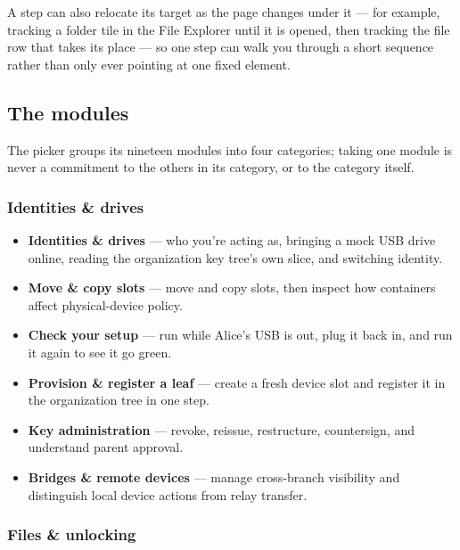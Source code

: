 A step can also relocate its target as the page changes under it --- for
example, tracking a folder tile in the File Explorer until it is opened,
then tracking the file row that takes its place --- so one step can walk
you through a short sequence rather than only ever pointing at one fixed
element.

\subsection{The modules}

The picker groups its nineteen modules into four categories; taking one
module is never a commitment to the others in its category, or to the
category itself.

\subsubsection{Identities \& drives}

\begin{itemize}
  \item \textbf{Identities \& drives} --- who you're acting as, bringing a
  mock USB drive online, reading the organization key tree's own slice, and
  switching identity.
  \item \textbf{Move \& copy slots} --- move and copy slots, then inspect
  how containers affect physical-device policy.
  \item \textbf{Check your setup} --- run  while
  Alice's USB is out, plug it back in, and run it again to see it go green.
  \item \textbf{Provision \& register a leaf} --- create a fresh device
  slot and register it in the organization tree in one step.
  \item \textbf{Key administration} --- revoke, reissue, restructure,
  countersign, and understand parent approval.
  \item \textbf{Bridges \& remote devices} --- manage cross-branch
  visibility and distinguish local device actions from relay transfer.
\end{itemize}

\subsubsection{Files \& unlocking}

